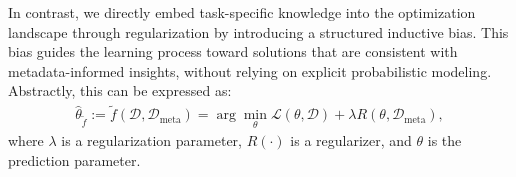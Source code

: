 In contrast, we directly embed task-specific knowledge into the optimization landscape through regularization by introducing a structured inductive bias. This bias guides the learning process toward solutions that are consistent with metadata-informed insights, without relying on explicit probabilistic modeling. Abstractly, this can be expressed as:
\begin{align}
    \!\!\!\!\!\hat{\theta}_{\tilde{f}} := \tilde{f}(\mathcal{D},\mathcal{D}
    _\text{meta})= \arg\min_{\theta} \mathcal{L}(\theta, \mathcal{D}) + \lambda R(\theta, \mathcal{D}_{\text{meta}}),
\end{align}
where \( \lambda \) is a regularization parameter, \( R(\cdot) \) is a regularizer, and $\theta$ is the prediction parameter.




